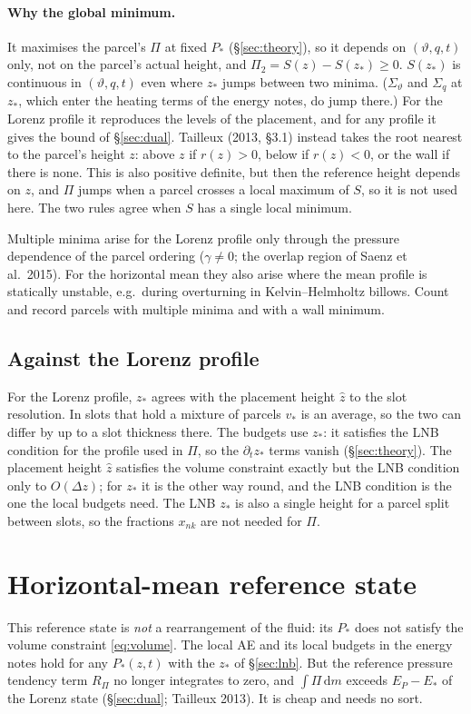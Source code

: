 \documentclass[11pt,a4paper]{article}
\newcommand{\vt}{\vartheta}
\newcommand{\zs}{z_{*}}
\newcommand{\zh}{\hat z}
\begin{document}
\paragraph{Why the global minimum.} It maximises the parcel's $\Pi$ at fixed $P_*$ (\S\ref{sec:theory}), so it depends on
$(\vt,q,t)$ only, not on the parcel's actual height, and $\Pi_2=S(z)-S(\zs)\ge0$. $S(\zs)$ is continuous in $(\vt,q,t)$ even
where $\zs$ jumps between two minima. ($\Sigma_\vt$ and $\Sigma_q$ at $\zs$, which enter the heating terms of the energy notes,
do jump there.) For the Lorenz profile it reproduces the levels of the placement, and for any profile it gives the
bound of \S\ref{sec:dual}. Tailleux (2013, \S3.1) instead takes the root nearest to the parcel's height $z$: above $z$ if
$r(z)>0$, below if $r(z)<0$, or the wall if there is none. This is also positive definite, but then the reference height
depends on $z$, and $\Pi$ jumps when a parcel crosses a local maximum of $S$, so it is not used here. The two rules agree when
$S$ has a single local minimum.

Multiple minima arise for the Lorenz profile only through the pressure dependence of the parcel ordering ($\gamma\ne0$; the
overlap region of Saenz et al.\ 2015). For the horizontal mean they also arise where the mean profile is statically unstable,
e.g.\ during overturning in Kelvin--Helmholtz billows. Count and record parcels with multiple minima and with a wall minimum.

\subsection{Against the Lorenz profile}
For the Lorenz profile, $\zs$ agrees with the placement height $\zh$ to the slot resolution. In slots that hold a
mixture of parcels $v_*$ is an average, so the two can differ by up to a slot thickness there. The budgets use $\zs$: it
satisfies the LNB condition for the profile used in $\Pi$, so the $\partial_t\zs$ terms vanish (\S\ref{sec:theory}). The
placement height $\zh$ satisfies the volume constraint exactly but the LNB condition only to $O(\Delta z)$; for $\zs$ it is the other
way round, and the LNB condition is the one the local budgets need. The LNB $\zs$ is also a single height for a parcel split
between slots, so the fractions $x_{nk}$ are not needed for $\Pi$.

\section{Horizontal-mean reference state}\label{sec:mean}
This reference state is \emph{not} a rearrangement of the fluid: its $P_*$ does not satisfy the volume constraint
\eqref{eq:volume}. The local AE and its local budgets in the energy notes hold for any $P_*(z,t)$ with the $\zs$ of
\S\ref{sec:lnb}. But the reference pressure tendency term $R_\Pi$ no longer integrates to zero, and $\int\Pi\,\mathrm{d}m$ exceeds
$E_P-E_*$ of the Lorenz state (\S\ref{sec:dual}; Tailleux 2013). It is cheap and needs no sort.
\end{document}
